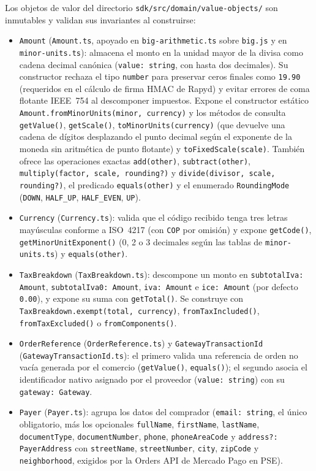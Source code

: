 Los objetos de valor del directorio \texttt{sdk/src/domain/value-objects/} son inmutables y validan sus invariantes al construirse:
\begin{itemize}\sloppy
  \item \texttt{Amount} (\texttt{Amount.ts}, apoyado en \texttt{big-arithmetic.ts} sobre \texttt{big.js} y en \texttt{minor-units.ts}): almacena el monto en la unidad mayor de la divisa como cadena decimal canónica (\texttt{value: string}, con hasta dos decimales). Su constructor rechaza el tipo \texttt{number} para preservar ceros finales como \texttt{19.90} (requeridos en el cálculo de firma HMAC de Rapyd) y evitar errores de coma flotante IEEE~754 al descomponer impuestos. Expone el constructor estático \texttt{Amount.fromMinorUnits(minor, currency)} y los métodos de consulta \texttt{getValue()}, \texttt{getScale()}, \texttt{toMinorUnits(currency)} (que devuelve una cadena de dígitos desplazando el punto decimal según el exponente de la moneda sin aritmética de punto flotante) y \texttt{toFixedScale(scale)}. También ofrece las operaciones exactas \texttt{add(other)}, \texttt{subtract(other)}, \texttt{multiply(factor, scale, rounding?)} y \texttt{divide(divisor, scale, rounding?)}, el predicado \texttt{equals(other)} y el enumerado \texttt{RoundingMode} (\texttt{DOWN}, \texttt{HALF\_UP}, \texttt{HALF\_EVEN}, \texttt{UP}).
  \item \texttt{Currency} (\texttt{Currency.ts}): valida que el código recibido tenga tres letras mayúsculas conforme a ISO~4217 (con \texttt{COP} por omisión) y expone \texttt{getCode()}, \texttt{getMinorUnitExponent()} (0, 2 o 3 decimales según las tablas de \texttt{minor-units.ts}) y \texttt{equals(other)}.
  \item \texttt{TaxBreakdown} (\texttt{TaxBreakdown.ts}): descompone un monto en \texttt{subtotalIva: Amount}, \texttt{subtotalIva0: Amount}, \texttt{iva: Amount} e \texttt{ice: Amount} (por defecto \texttt{0.00}), y expone su suma con \texttt{getTotal()}. Se construye con \texttt{TaxBreakdown.exempt(total, currency)}, \texttt{fromTaxIncluded()}, \texttt{fromTaxExcluded()} o \texttt{fromComponents()}.
  \item \texttt{OrderReference} (\texttt{OrderReference.ts}) y \texttt{GatewayTransactionId} (\texttt{GatewayTransactionId.ts}): el primero valida una referencia de orden no vacía generada por el comercio (\texttt{getValue()}, \texttt{equals()}); el segundo asocia el identificador nativo asignado por el proveedor (\texttt{value: string}) con su \texttt{gateway: Gateway}.
  \item \texttt{Payer} (\texttt{Payer.ts}): agrupa los datos del comprador (\texttt{email: string}, el único obligatorio, más los opcionales \texttt{fullName}, \texttt{firstName}, \texttt{lastName}, \texttt{documentType}, \texttt{documentNumber}, \texttt{phone}, \texttt{phoneAreaCode} y \texttt{address?: PayerAddress} con \texttt{streetName}, \texttt{streetNumber}, \texttt{city}, \texttt{zipCode} y \texttt{neighborhood}, exigidos por la Orders API de Mercado Pago en PSE).

\end{itemize}
